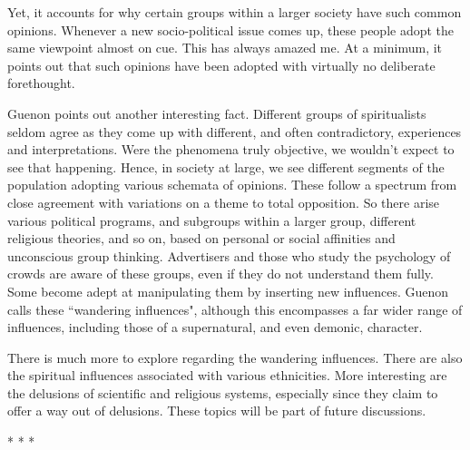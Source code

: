 Yet, it accounts for why certain groups within a larger society have such common opinions. Whenever a new socio-political issue comes up, these people adopt the same viewpoint almost on cue. This has always amazed me. At a minimum, it points out that such opinions have been adopted with virtually no deliberate forethought.

Guenon points out another interesting fact. Different groups of spiritualists seldom agree as they come up with different, and often contradictory, experiences and interpretations. Were the phenomena truly objective, we wouldn't expect to see that happening. Hence, in society at large, we see different segments of the population adopting various schemata of opinions. These follow a spectrum from close agreement with variations on a theme to total opposition. So there arise various political programs, and subgroups within a larger group, different religious theories, and so on, based on personal or social affinities and unconscious group thinking. Advertisers and those who study the psychology of crowds are aware of these groups, even if they do not understand them fully. Some become adept at manipulating them by inserting new influences. Guenon calls these ``wandering influences", although this encompasses a far wider range of influences, including those of a supernatural, and even demonic, character.

There is much more to explore regarding the wandering influences. There are also the spiritual influences associated with various ethnicities. More interesting are the delusions of scientific and religious systems, especially since they claim to offer a way out of delusions. These topics will be part of future discussions.




\begin{center}* * *\end{center}


